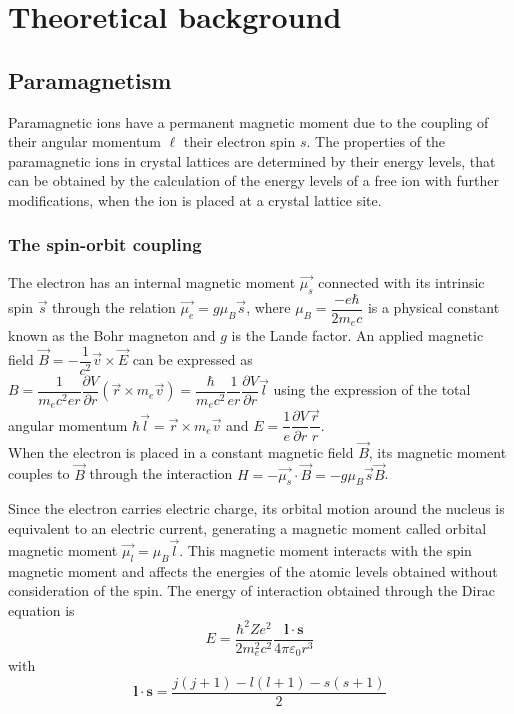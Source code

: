 \documentclass[openany,11pt,a4paper]{report}
\begin{document}
\chapter{Theoretical background}



\section*{Paramagnetism}
Paramagnetic ions have a permanent magnetic moment due to the coupling of their angular
momentum $\ell$ their electron spin $s$. The properties of the paramagnetic ions in crystal lattices are determined by their energy levels, that can be obtained by the calculation
of the energy levels of a free ion with further modifications, when the ion is placed at a
crystal lattice site.


\subsection{The spin-orbit coupling}


The electron has an internal magnetic moment $\vec{\mu_ {s}}$ connected with its intrinsic spin $\vec{s}$ through the relation $\vec{ \mu_ {e}} = g \mu_ {B}  \vec{s} $, where $ \mu_ {B} =  \dfrac{ -e \hbar}{2m_ {e} c} $ is a physical constant known as the Bohr magneton and $g$ is the Lande factor. An applied magnetic field $\vec{B}=- \dfrac{1}{c^{2}} \vec{v} \times \vec{E}$ can be expressed as $B= \dfrac{1}{m_{e}c^{2}e r} \dfrac{\partial V }{ \partial r} ( \vec{r} \times m_{e} \vec{v})=\dfrac{\hbar}{m_{e}c^{2}}\dfrac{1}{er} \dfrac{\partial V}{ \partial r} \vec{l}$ using the expression of the total angular momentum $\hbar \vec{l}= \vec{r} \times m_{e} \vec{v} $ and  $E=\dfrac{1}{e} \dfrac{\partial V}{ \partial r} \dfrac{\vec{r}}{r}$.\\

When the electron is placed in a constant
magnetic field $\vec{B}$, its magnetic moment couples to $\vec{B}$ through the interaction $H = - \vec{\mu_{s}} \cdot \vec{B}=-g \mu_{B} \vec{s} \vec{B} $.





Since the electron carries electric charge, its orbital motion around the nucleus is equivalent to an electric current, generating a magnetic moment called orbital magnetic moment $\vec{ \mu _{l}} = \mu_ {B} \vec{l}$.
This magnetic moment interacts with the spin magnetic moment and affects the
energies of the atomic levels obtained without consideration of
the spin.
The energy of interaction obtained through the Dirac equation is 
\begin{equation}
E= \frac{\hbar^{2}Ze^{2}}{2m_{e}^{2}c^{2}} \frac{\bm{l}\cdot \bm{s}}{4 \pi \varepsilon_{0} r^{3}} \label{eq:spinorbitint}
\end{equation}
with
\begin{equation}
\bm{l} \cdot \bm{s} = \dfrac{ j(j+1)-l(l+1) -s(s+1)}{2}
\end{equation}
\end{document}
